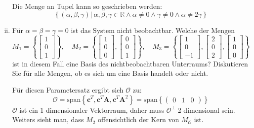 \documentclass[crop=false]{standalone}
\begin{document}
\begin{task}
\begin{enumerate}[i.]
\begin{solution}
Die Menge an Tupel kann so geschrieben werden:
\[ \left\{ \left(\alpha,\beta,\gamma \right) | \  \alpha,\beta,\gamma \in \mathbb{R} \land \alpha \neq 0 \land  \gamma \neq 0 \land \alpha \neq 2 \gamma \right\} \]
\end{solution}
\item Für $\alpha=\beta=\gamma=0$ ist das System nicht beobachtbar. Welche der Mengen
\[ 
M_{1}=\left\{\left[\begin{array}{l}{1} \\ {0} \\ {1}\end{array}\right]\right\}, \quad M_{2}=\left\{\left[\begin{array}{l}{1} \\ {0} \\ {0}\end{array}\right],\left[\begin{array}{l}{0} \\ {0} \\ {1}\end{array}\right]\right\}, \quad M_{3}=\left\{\left[\begin{array}{c}{1} \\ {0} \\ {-1}\end{array}\right],\left[\begin{array}{l}{2} \\ {0} \\ {2}\end{array}\right],\left[\begin{array}{l}{1} \\ {0} \\ {0}\end{array}\right]\right\}
 \]
 ist in diesem Fall eine Basis des nichtbeobachtbaren Unterraums? Diskutieren Sie für alle Mengen, ob es sich um eine Basis handelt oder nicht.
\begin{solution}
Für diesen Parametersatz ergibt sich $\mathcal{O}$ zu:
\[\mathcal{O} = \text{span}\left\{ \mathbf{c}^T, \mathbf{c}^T\mathbf{A}, \mathbf{c}^T \mathbf{A}^2\right\} =
\text{span}\left\{ \begin{pmatrix}
0 & 1 & 0
\end{pmatrix}\right\}
\]
$\mathcal{O}$ ist ein 1-dimensionaler Vektorraum, daher muss $\mathcal{O}^\perp$ 2-dimensional sein. Weiters sieht man, dass $M_2$ offensichtlich der Kern von $M_{\mathcal{O}}$ ist.
\end{solution}
\end{enumerate}
\end{task}
\end{document}
